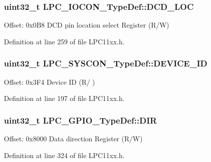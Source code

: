 \subsubsection[{\texorpdfstring{D\+C\+D\+\_\+\+L\+OC}{DCD_LOC}}]{ uint32\+\_\+t L\+P\+C\+\_\+\+I\+O\+C\+O\+N\+\_\+\+Type\+Def\+::\+D\+C\+D\+\_\+\+L\+OC}\hypertarget{group___l_p_c11xx___definitions_gae619bf8f2c109b169f653a8689656350}{}\label{group___l_p_c11xx___definitions_gae619bf8f2c109b169f653a8689656350}
Offset\+: 0x0\+B8 D\+CD pin location select Register (R/W) 

Definition at line 259 of file L\+P\+C11xx.\+h.

\subsubsection[{\texorpdfstring{D\+E\+V\+I\+C\+E\+\_\+\+ID}{DEVICE_ID}}]{ uint32\+\_\+t L\+P\+C\+\_\+\+S\+Y\+S\+C\+O\+N\+\_\+\+Type\+Def\+::\+D\+E\+V\+I\+C\+E\+\_\+\+ID}\hypertarget{group___l_p_c11xx___definitions_ga4ab05124b010cfedcc6af2f10290cb27}{}\label{group___l_p_c11xx___definitions_ga4ab05124b010cfedcc6af2f10290cb27}
Offset\+: 0x3\+F4 Device ID (R/ ) 

Definition at line 197 of file L\+P\+C11xx.\+h.

\subsubsection[{\texorpdfstring{D\+IR}{DIR}}]{ uint32\+\_\+t L\+P\+C\+\_\+\+G\+P\+I\+O\+\_\+\+Type\+Def\+::\+D\+IR}\hypertarget{group___l_p_c11xx___definitions_ga39dad13799c53cc50122d3b504f1f215}{}\label{group___l_p_c11xx___definitions_ga39dad13799c53cc50122d3b504f1f215}
Offset\+: 0x8000 Data direction Register (R/W) 

Definition at line 324 of file L\+P\+C11xx.\+h.

